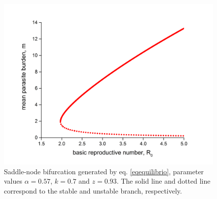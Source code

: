 \documentclass[eng]{MMSB-class-eng}
\begin{document}
{%
\begin{figure}[h!]
	\centering
	\includegraphics[width=0.99\linewidth]{bifurcation}
	\caption{Saddle-node bifurcation generated by eq. \eqref{eqequilibrio}, parameter values $\alpha=0.57$, $k=0.7$ and $z=0.93$.
	The solid line and dotted line correspond to the stable and unstable branch, respectively.}
	\label{f:phase}
\end{figure}

}
\end{document}
